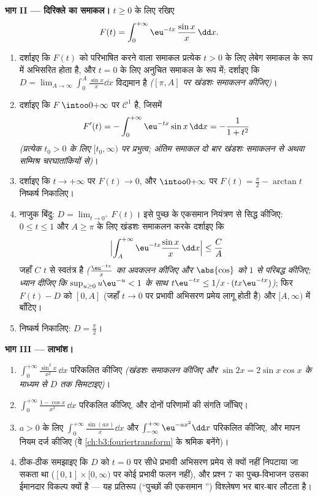 \begin{problem}[{सप्ताहांत समस्या --- गाउसीय समाकल और दिरिक्ले का
समाकल, केवल प्राचलों से}]
\medskip
\noindent\textbf{भाग II --- दिरिक्ले का समाकल।} $t
\geq 0$ के लिए
रखिए
\[
F(t) = \int_0^{+\infty}\eu^{-tx}\,\frac{\sin x}{x}\,\dd x .
\]
\begin{enumerate}[resume]
  \item दर्शाइए कि $F(t)$ को परिभाषित करने वाला समाकल प्रत्येक
        $t > 0$ के लिए लेबेग समाकल के रूप में अभिसरित होता है, और
        $t = 0$ के लिए अनुचित समाकल के रूप में; दर्शाइए कि $D =
        \lim_{A\to\infty}\int_0^A\frac{\sin x}x\dd x$
        विद्यमान है \emph{($[\pi, A]$ पर खंडशः समाकलन कीजिए)}।
  \item दर्शाइए कि $F$ $\intoo0{+\infty}$ पर $\mathcal C^1$ है, जिसमें
        \[
        F'(t) = -\int_0^{+\infty}\eu^{-tx}\sin x\,\dd x
        = -\frac{1}{1 + t^2}
        \]
        \emph{(प्रत्येक $t_0 >
        0$ के लिए $[t_0, \infty)$ पर प्रभुत्व; अंतिम
        समाकल दो बार खंडशः समाकलन से अथवा सम्मिश्र चरघातांकियों
        से)}।
  \item दर्शाइए कि $t \to +\infty$ पर $F(t) \to 0$, और $\intoo0{+\infty}$ पर $F(t)
        = \frac\pi2 - \arctan t$ निष्कर्ष
        निकालिए।
  \item नाजुक बिंदु: $D = \lim_{t\to0^+}F(t)$। इसे पुच्छ के एकसमान नियंत्रण से सिद्ध
        कीजिए: $0 \leq t \leq 1$ और $A \geq \pi$ के लिए खंडशः समाकलन करके दर्शाइए कि
        \[
        \Bigl|\int_A^{+\infty}\eu^{-tx}\frac{\sin
        x}x\,\dd x\Bigr| \leq \frac{C}{A}
        \]
        जहाँ $C$ $t$ से स्वतंत्र है \emph{($\frac{\eu^{-tx}}x$ का अवकलन
        कीजिए और $\abs{\cos}$ को $1$ से परिबद्ध कीजिए; ध्यान दीजिए कि
        $\sup_{u\geq0}u\eu^{-u} < 1$ के साथ $t\eu^{-tx} \leq 1/x\cdot(tx\eu^{-tx})$)}; फिर $F(t) - D$ को $[0, A]$ (जहाँ $t \to 0$ पर
        प्रभावी अभिसरण प्रमेय लागू होती है) और $[A, \infty)$ में बाँटिए।
  \item निष्कर्ष निकालिए: $D = \frac\pi2$।
\end{enumerate}

\medskip
\noindent\textbf{भाग III --- लाभांश।}
\begin{enumerate}[resume]
  \item $\int_0^{+\infty}\frac{\sin^2x}{x^2}\,\dd x$ परिकलित कीजिए \emph{(खंडशः समाकलन कीजिए और $\sin
        2x = 2\sin x\cos x$ के
        माध्यम से $D$ तक सिमटाइए)}।
  \item $\int_0^{+\infty}\frac{1 -
        \cos x}{x^2}\,\dd x$ परिकलित कीजिए, और दोनों परिणामों की संगति जाँचिए।
  \item $a > 0$ के लिए $\int_0^{+\infty}\frac{\sin(ax)}x\dd x$ और $\int_{-\infty}^{+\infty}\eu^{-ax^2}\dd x$ परिकलित कीजिए, और मापन नियम
        दर्ज कीजिए (वे \cref{ch:b3:fouriertransform} के श्रमिक बनेंगे)।
  \item ठीक-ठीक समझाइए कि $D$ को $t = 0$ पर सीधे प्रभावी अभिसरण
        प्रमेय से क्यों नहीं निपटाया जा सकता था ($[0,1]\times[0,\infty)$ पर कोई
         प्रभावी फलन नहीं), और प्रश्न 7 का पुच्छ-विभाजन
        उसका ईमानदार विकल्प क्यों है --- यह प्रतिरूप (``पुच्छों की
        एकसमान '') विश्लेषण भर बार-बार लौटता है।
\end{enumerate}


\end{problem}
